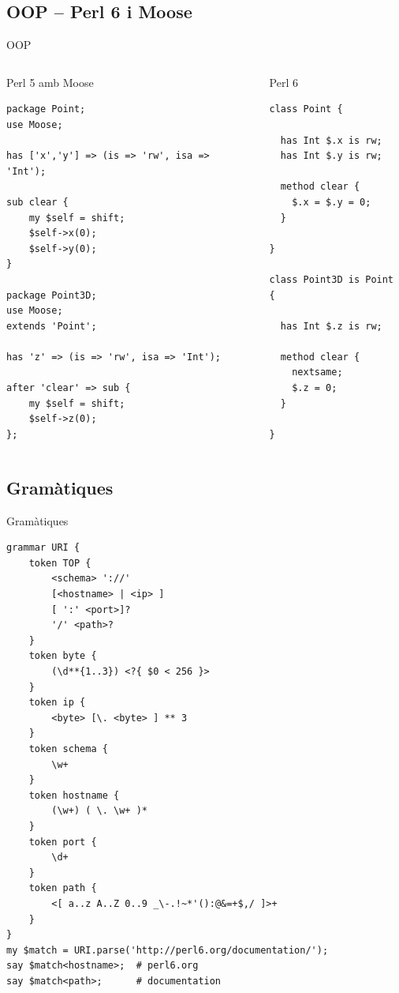 \documentclass{beamer}
\begin{document}
			\subsection{OOP -- Perl 6 i Moose}
\begin{frame}[fragile]{OOP}
\begin{columns}[t]
	\begin{column}{0.5\textwidth}
	\begin{block}{Perl 5 amb Moose}
{\tiny
\begin{verbatim}
package Point;
use Moose;

has ['x','y'] => (is => 'rw', isa => 'Int');

sub clear {
    my $self = shift;
    $self->x(0);
    $self->y(0);
}

package Point3D;
use Moose;
extends 'Point';

has 'z' => (is => 'rw', isa => 'Int');

after 'clear' => sub {
    my $self = shift;
    $self->z(0);
};
\end{verbatim}
}
	\end{block}
	\end{column}
	\begin{column}{0.5\textwidth}
	\begin{block}{Perl 6}
{\tiny
\begin{verbatim}
class Point {

  has Int $.x is rw;
  has Int $.y is rw;

  method clear {
    $.x = $.y = 0;
  }

}

class Point3D is Point {

  has Int $.z is rw;

  method clear {
    nextsame;
    $.z = 0;
  }

}
\end{verbatim}
}
	\end{block}
	\end{column}
\end{columns}
\end{frame}
			\subsection{Gramàtiques}
\begin{frame}[fragile]{Gramàtiques}
\tiny
\begin{verbatim}
grammar URI {
    token TOP {
        <schema> '://'
        [<hostname> | <ip> ]
        [ ':' <port>]?
        '/' <path>?
    }
    token byte {
        (\d**{1..3}) <?{ $0 < 256 }>
    }
    token ip {
        <byte> [\. <byte> ] ** 3
    }
    token schema {
        \w+
    }
    token hostname {
        (\w+) ( \. \w+ )*
    }
    token port {
        \d+
    }
    token path {
        <[ a..z A..Z 0..9 _\-.!~*'():@&=+$,/ ]>+
    }
}
my $match = URI.parse('http://perl6.org/documentation/');
say $match<hostname>;  # perl6.org
say $match<path>;      # documentation
\end{verbatim}
\end{frame}
\end{document}

